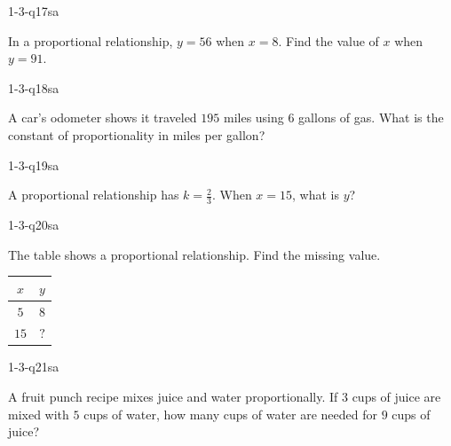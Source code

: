 \begin{practiceQuestion}{1-3-q17}{sa}
\begin{questionText}
In a proportional relationship, $y = 56$ when $x = 8$. Find the value of $x$ when $y = 91$.
\end{questionText}
\end{practiceQuestion}

\begin{practiceQuestion}{1-3-q18}{sa}
\begin{questionText}
A car's odometer shows it traveled $195$ miles using $6$ gallons of gas. What is the constant of proportionality in miles per gallon?
\end{questionText}
\end{practiceQuestion}

\begin{practiceQuestion}{1-3-q19}{sa}
\begin{questionText}
A proportional relationship has $k = \frac{2}{3}$. When $x = 15$, what is $y$?
\end{questionText}
\end{practiceQuestion}

\begin{practiceQuestion}{1-3-q20}{sa}
\begin{questionText}
The table shows a proportional relationship. Find the missing value.

\begin{center}
\begin{tabular}{|c|c|}
\hline
$x$ & $y$ \\
\hline
$5$ & $8$ \\
$15$ & $?$ \\
\hline
\end{tabular}
\end{center}
\end{questionText}
\end{practiceQuestion}

\begin{practiceQuestion}{1-3-q21}{sa}
\begin{questionText}
A fruit punch recipe mixes juice and water proportionally. If $3$ cups of juice are mixed with $5$ cups of water, how many cups of water are needed for $9$ cups of juice?
\end{questionText}
\end{practiceQuestion}

